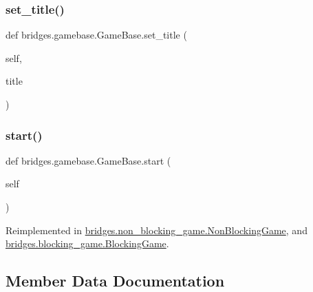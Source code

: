 \mbox{\label{classbridges_1_1gamebase_1_1_game_base_a7e7d4033c4b191b3699dbf0cb5f25933}} 
\subsubsection{\texorpdfstring{set\_title()}{set\_title()}}
{\footnotesize\ttfamily def bridges.\+gamebase.\+Game\+Base.\+set\+\_\+title (\begin{DoxyParamCaption}\item[{}]{self,  }\item[{}]{title }\end{DoxyParamCaption})}

\mbox{\label{classbridges_1_1gamebase_1_1_game_base_a05a30fccf88c2baba1137b5a06ba2ed7}} 
\subsubsection{\texorpdfstring{start()}{start()}}
{\footnotesize\ttfamily def bridges.\+gamebase.\+Game\+Base.\+start (\begin{DoxyParamCaption}\item[{}]{self }\end{DoxyParamCaption})}



Reimplemented in \mbox{\hyperlink{classbridges_1_1non__blocking__game_1_1_non_blocking_game_ad6e23c265e1b710114459f0b666d25cb}{bridges.\+non\+\_\+blocking\+\_\+game.\+Non\+Blocking\+Game}}, and \mbox{\hyperlink{classbridges_1_1blocking__game_1_1_blocking_game_ab7a2a5d6d83b2e72800ddffa3c0ad818}{bridges.\+blocking\+\_\+game.\+Blocking\+Game}}.



\subsection{Member Data Documentation}
\mbox{\label{classbridges_1_1gamebase_1_1_game_base_a2310e51f398c089ca945b3af38c09231}} 
